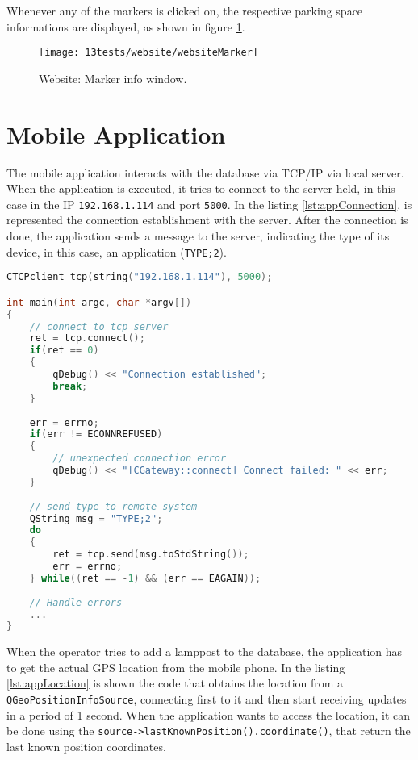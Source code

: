 Whenever any of the markers is clicked on, the respective parking space informations are displayed, as shown in figure \ref{fig:websiteMarker}.

\begin{figure}[H]
	\centering	
	\texttt{[image: 13tests/website/websiteMarker]}
	\caption{Website: Marker info window.}
	\label{fig:websiteMarker}
\end{figure}


\section{Mobile Application}

The mobile application interacts with the database via TCP/IP via local server. When the application is executed, it tries to connect to the server held, in this case in the IP \verb|192.168.1.114| and port \verb|5000|. In the listing \ref{lst:appConnection}, is represented the connection establishment with the server. After the connection is done, the application sends a message to the server, indicating the type of its device, in this case, an application (\verb|TYPE;2|).

\begin{lstlisting}[language=C, caption={Mobile Application: Connection to the server.}, label={lst:appConnection}]
CTCPclient tcp(string("192.168.1.114"), 5000);

int main(int argc, char *argv[])
{
	// connect to tcp server
	ret = tcp.connect();
	if(ret == 0)
	{
		qDebug() << "Connection established";
		break;
	}
	
	err = errno;
	if(err != ECONNREFUSED)
	{
		// unexpected connection error
		qDebug() << "[CGateway::connect] Connect failed: " << err;
	}
	
	// send type to remote system
	QString msg = "TYPE;2";	
	do
	{
		ret = tcp.send(msg.toStdString());
		err = errno;
	} while((ret == -1) && (err == EAGAIN));
	
	// Handle errors
	...
}
\end{lstlisting}

When the operator tries to add a lamppost to the database, the application has to get the actual GPS location from the mobile phone. In the listing \ref{lst:appLocation} is shown the code that obtains the location from a \verb|QGeoPositionInfoSource|, connecting first to it and then start receiving updates in a period of 1 second. When the application wants to access the location, it can be done using the \verb|source->lastKnownPosition().coordinate()|, that return the last known position coordinates.


